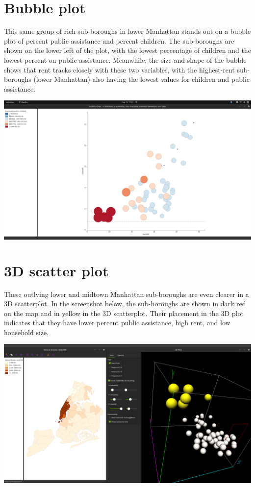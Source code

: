 \documentclass[11pt]{article}
\begin{document}
\section{Bubble plot}
\label{sec:org31096f8}
This same group of rich sub-boroughs in lower Manhattan stands out on a bubble plot of percent public assistance and percent children. The sub-boroughs are shown on the lower left of the plot, with the lowest percentage of children and the lowest percent on public assistance. Meanwhile, the size and shape of the bubble shows that rent tracks closely with these two variables, with the highest-rent sub-boroughs (lower Manhattan) also having the lowest values for children and public assistance.

\begin{center}
\includegraphics[width=.9\linewidth]{bubble.png}
\end{center}

\section{3D scatter plot}
\label{sec:orgc58ca5a}
These outlying lower and midtown Manhattan sub-boroughs are even clearer in a 3D scatterplot. In the screenshot below, the sub-boroughs are shown in dark red on the map and in yellow in the 3D scatterplot. Their placement in the 3D plot indicates that they have lower percent public assistance, high rent, and low household size.

\begin{center}
\includegraphics[width=.9\linewidth]{3d_scatter_lower_manhattan.png}
\end{center}
\end{document}
